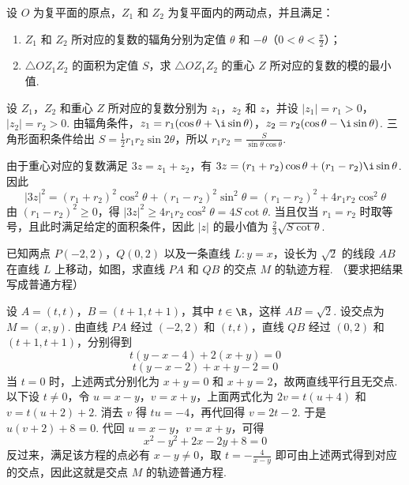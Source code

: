 \begin{problem}

设 \(O\) 为复平面的原点，\(Z_{1}\) 和 \(Z_{2}\) 为复平面内的两动点，并且满足：

\begin{enumerate}
\item \(Z_{1}\) 和 \(Z_{2}\) 所对应的复数的辐角分别为定值 \(\theta\) 和 \(-\theta\)（\(0<\theta<\frac{\pi}{2}\)）；
\item \(\triangle OZ_{1}Z_{2}\) 的面积为定值 \(S\)，求 \(\triangle OZ_{1}Z_{2}\) 的重心 \(Z\) 所对应的复数的模的最小值.
\end{enumerate}

\begin{solution}
设 \(Z_1\)，\(Z_2\) 和重心 \(Z\) 所对应的复数分别为 \(z_1\)，\(z_2\) 和 \(z\)，并设 \(|z_1|=r_1>0\)，\(|z_2|=r_2>0\). 由辐角条件，\(z_1=r_1(\cos\theta+\i\sin\theta)\)，\(z_2=r_2(\cos\theta-\i\sin\theta)\). 三角形面积条件给出 \(S=\frac{1}{2}r_1r_2\sin 2\theta\)，所以 \(r_1r_2=\frac{S}{\sin\theta\cos\theta}\).

由于重心对应的复数满足 \(3z=z_1+z_2\)，有 \(3z=(r_1+r_2)\cos\theta+(r_1-r_2)\i\sin\theta\). 因此
\[
|3z|^2=(r_1+r_2)^2\cos^2\theta+(r_1-r_2)^2\sin^2\theta=(r_1-r_2)^2+4r_1r_2\cos^2\theta
\]
由 \((r_1-r_2)^2\geqslant0\)，得 \(|3z|^2\geqslant4r_1r_2\cos^2\theta=4S\cot\theta\). 当且仅当 \(r_1=r_2\) 时取等号，且此时满足给定的面积条件，因此 \(|z|\) 的最小值为 \(\frac{2}{3}\sqrt{S\cot\theta}\).
\end{solution}
\end{problem}

\begin{problem}

已知两点 \(P\left(-2,2\right)\)，\(Q\left(0,2\right)\) 以及一条直线 \(L:y=x\)，设长为 \(\sqrt{2}\) 的线段 \(AB\) 在直线 \(L\) 上移动，如图，求直线 \(PA\) 和 \(QB\) 的交点 \(M\) 的轨迹方程. （要求把结果写成普通方程）


\begin{solution}
设 \(A=(t,t)\)，\(B=(t+1,t+1)\)，其中 \(t\in\R\)，这样 \(AB=\sqrt{2}\). 设交点为 \(M=(x,y)\). 由直线 \(PA\) 经过 \((-2,2)\) 和 \((t,t)\)，直线 \(QB\) 经过 \((0,2)\) 和 \((t+1,t+1)\)，分别得到
\[
t(y-x-4)+2(x+y)=0
\]
\[
t(y-x-2)+x+y-2=0
\]
当 \(t=0\) 时，上述两式分别化为 \(x+y=0\) 和 \(x+y=2\)，故两直线平行且无交点. 以下设 \(t\neq0\)，令 \(u=x-y\)，\(v=x+y\)，上面两式化为 \(2v=t(u+4)\) 和 \(v=t(u+2)+2\). 消去 \(v\) 得 \(tu=-4\)，再代回得 \(v=2t-2\). 于是 \(u(v+2)+8=0\). 代回 \(u=x-y\)，\(v=x+y\)，可得
\[
x^2-y^2+2x-2y+8=0
\]
反过来，满足该方程的点必有 \(x-y\neq0\)，取 \(t=-\frac{4}{x-y}\) 即可由上述两式得到对应的交点，因此这就是交点 \(M\) 的轨迹普通方程.
\end{solution}
\end{problem}

